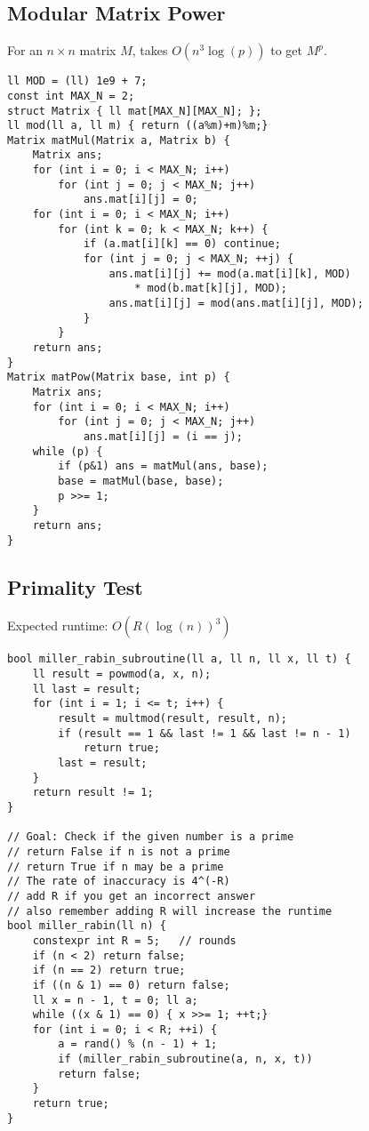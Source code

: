 \documentclass[10pt]{article}{\twocolumn}
\begin{document}
\subsection{Modular Matrix Power}
For an $n \times n$ matrix $M$, takes $O(n^3\log(p))$ to
get $M^p$.
\begin{lstlisting}
ll MOD = (ll) 1e9 + 7; 
const int MAX_N = 2;
struct Matrix { ll mat[MAX_N][MAX_N]; };
ll mod(ll a, ll m) { return ((a%m)+m)%m;}
Matrix matMul(Matrix a, Matrix b) {
    Matrix ans;
    for (int i = 0; i < MAX_N; i++) 
        for (int j = 0; j < MAX_N; j++) 
            ans.mat[i][j] = 0;
    for (int i = 0; i < MAX_N; i++) 
        for (int k = 0; k < MAX_N; k++) {
            if (a.mat[i][k] == 0) continue;
            for (int j = 0; j < MAX_N; ++j) {
                ans.mat[i][j] += mod(a.mat[i][k], MOD) 
                    * mod(b.mat[k][j], MOD); 
                ans.mat[i][j] = mod(ans.mat[i][j], MOD);
            }
        }
    return ans;
}
Matrix matPow(Matrix base, int p) {
    Matrix ans;
    for (int i = 0; i < MAX_N; i++) 
        for (int j = 0; j < MAX_N; j++) 
            ans.mat[i][j] = (i == j);
    while (p) {
        if (p&1) ans = matMul(ans, base);
        base = matMul(base, base);
        p >>= 1;
    }
    return ans;
}
\end{lstlisting}

\subsection{Primality Test}
Expected runtime: $O(R(\log(n))^3)$
\begin{lstlisting}
bool miller_rabin_subroutine(ll a, ll n, ll x, ll t) {
    ll result = powmod(a, x, n);
    ll last = result;
    for (int i = 1; i <= t; i++) {
        result = multmod(result, result, n);
        if (result == 1 && last != 1 && last != n - 1)
            return true;
        last = result;
    }
    return result != 1;
}

// Goal: Check if the given number is a prime
// return False if n is not a prime
// return True if n may be a prime
// The rate of inaccuracy is 4^(-R)
// add R if you get an incorrect answer
// also remember adding R will increase the runtime
bool miller_rabin(ll n) {
    constexpr int R = 5;   // rounds
    if (n < 2) return false;
    if (n == 2) return true;
    if ((n & 1) == 0) return false;
    ll x = n - 1, t = 0; ll a;
    while ((x & 1) == 0) { x >>= 1; ++t;}
    for (int i = 0; i < R; ++i) {
        a = rand() % (n - 1) + 1;
        if (miller_rabin_subroutine(a, n, x, t)) 
        return false;
    }
    return true;
}
\end{lstlisting}
\end{document}
